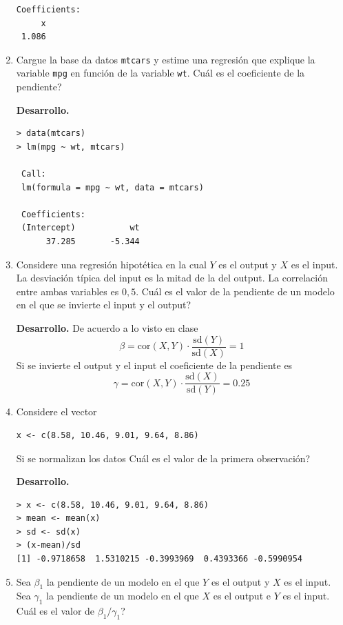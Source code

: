 \documentclass[11pt,oneside,spanish]{article}
\theoremstyle{definition}
\theoremstyle{definition}\newtheorem{definicion}{Definicin}
\theoremstyle{definition}\newtheorem{ejemplo}{Ejemplo}
\theoremstyle{remark}\newtheorem{nota}{\textsc{Nota}}
\theoremstyle{definition}\newtheorem{proposicion}{Proposicin}
\theoremstyle{definition}\newtheorem{problema}{Problema}
\begin{document}
\begin{enumerate}[(1)]
\begin{lstlisting}[backgroundcolor=\color{Gray!20},frame=none,basicstyle=\ttfamily]
 Coefficients:
     x   
 1.086 
\end{lstlisting}
	
\item Cargue la  base da datos \texttt{mtcars} y estime una regresi\'on que explique la variable \texttt{mpg} en funci\'on de la variable \texttt{wt}. {\textquestiondown}Cu\'al es el coeficiente de la pendiente?	

\textbf{Desarrollo.}
\begin{lstlisting}[backgroundcolor=\color{Gray!20},frame=none,basicstyle=\ttfamily]
> data(mtcars)
> lm(mpg ~ wt, mtcars)

 Call:
 lm(formula = mpg ~ wt, data = mtcars)

 Coefficients:
 (Intercept)           wt  
      37.285       -5.344  
\end{lstlisting}

\item Considere una regresi\'on hipot\'etica en la cual $Y$ es el output y $X$ es el input. La desviaci\'on t\'ipica del input es la mitad de la del output. La correlaci\'on entre ambas variables es $0,5$. {\textquestiondown}Cu\'al es el valor de la pendiente de un modelo en el que se invierte el input y el output?

\textbf{Desarrollo.}
De acuerdo a lo visto en clase 
$$\beta = \text{cor}(X,Y) \cdot \frac{\text{sd}(Y)}{\text{sd}(X)} =  1$$
Si se invierte el output y el input el coeficiente de la pendiente es
$$\gamma = \text{cor}(X,Y) \cdot \frac{\text{sd}(X)}{\text{sd}(Y)} = 0.25$$

\item Considere el vector 
\begin{lstlisting}[backgroundcolor=\color{Gray!20},frame=none,basicstyle=\ttfamily]
 x <- c(8.58, 10.46, 9.01, 9.64, 8.86)
\end{lstlisting}
Si se normalizan los datos {\textquestiondown}Cu\'al es el valor de la primera observaci\'on?	

\textbf{Desarrollo.}
\begin{lstlisting}[backgroundcolor=\color{Gray!20},frame=none,basicstyle=\ttfamily]
> x <- c(8.58, 10.46, 9.01, 9.64, 8.86)
> mean <- mean(x)
> sd <- sd(x)
> (x-mean)/sd
[1] -0.9718658  1.5310215 -0.3993969  0.4393366 -0.5990954
\end{lstlisting}

\item Sea $\beta_1$ la pendiente de un modelo en el que $Y$ es el output y $X$ es el input. Sea $\gamma_1$ la pendiente de un modelo en el que $X$ es el output e $Y$ es el input. {\textquestiondown}Cu\'al es el valor de $\beta_1 / \gamma_1$?		


\end{enumerate}
\end{document}
